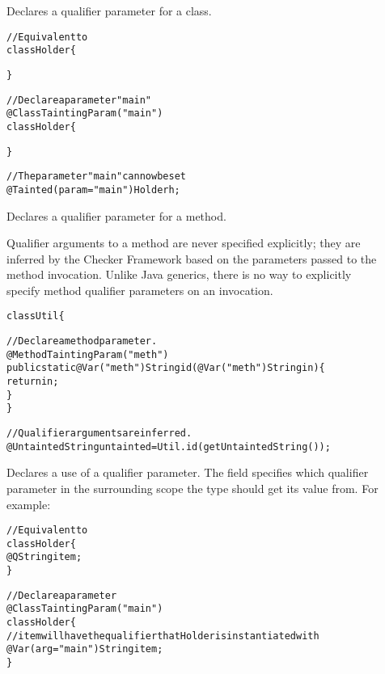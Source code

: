\begin{description}
\item[]
Declares a qualifier parameter for a class.

\begin{alltt}

  // Equivalent to
  class Holder  \{

  \}

  // Declare a parameter "main"
  @ClassTaintingParam("main")
  class Holder \{

  \}

  // The parameter "main" can now be set
  @Tainted(param="main") Holder h;

\end{alltt}

\item[]
Declares a qualifier parameter for a method.

Qualifier arguments to a method are never specified explicitly; they are
inferred by the Checker Framework based on the parameters passed to the method
invocation. Unlike Java generics, there is no way to explicitly specify
method qualifier parameters on an invocation.

\begin{alltt}

  class Util \{

    // Declare a method parameter.
    @MethodTaintingParam("meth")
    public static @Var("meth") String id(@Var("meth") String in) \{
        return in;
    \}
  \}

  // Qualifier arguments are inferred.
  @Untainted String untainted = Util.id(getUntaintedString());

\end{alltt}

\item[] Declares a use
of a qualifier parameter. The  field
specifies which qualifier parameter in the surrounding scope the type should
get its value from. For example:

\begin{alltt}

  // Equivalent to
  class Holder  \{
    @Q String item;
  \}

  // Declare a parameter
  @ClassTaintingParam ("main")
  class Holder \{
    // item will have the qualifier that Holder is instantiated with
    @Var(arg="main") String item;
  \}


\end{alltt}
\end{description}
